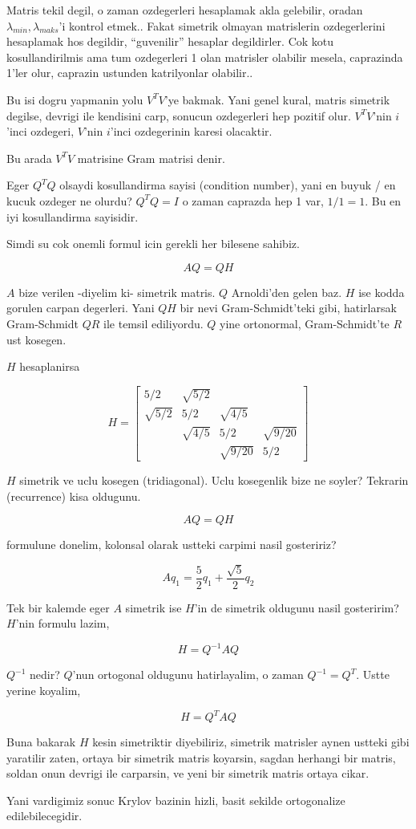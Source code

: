 \documentclass[12pt,fleqn]{article}\usepackage{../common}
\begin{document}
Matris tekil degil, o zaman ozdegerleri hesaplamak akla gelebilir,
oradan $\lambda_{min}, \lambda_{maks}$'i kontrol etmek.. Fakat simetrik
olmayan matrislerin ozdegerlerini hesaplamak hos degildir, ``guvenilir''
hesaplar degildirler. Cok kotu kosullandirilmis ama tum ozdegerleri 1 olan
matrisler olabilir mesela, caprazinda 1'ler olur, caprazin ustunden
katrilyonlar olabilir.. 

Bu isi dogru yapmanin yolu $V^TV$'ye bakmak. Yani genel kural, matris
simetrik degilse, devrigi ile kendisini carp, sonucun ozdegerleri hep
pozitif olur. $V^TV$'nin $i$'inci ozdegeri, $V$'nin $i$'inci ozdegerinin
karesi olacaktir. 

Bu arada $V^TV$ matrisine Gram matrisi denir. 

Eger $Q^TQ$ olsaydi kosullandirma sayisi (condition number), yani en buyuk /
en kucuk ozdeger ne olurdu? $Q^TQ = I$  o zaman caprazda hep 1 var, $1/1 =
1$. 
Bu en iyi kosullandirma sayisidir. 

Simdi su cok onemli formul icin gerekli her bilesene sahibiz. 

\[ AQ = QH \]

$A$ bize verilen -diyelim ki- simetrik matris. $Q$ Arnoldi'den gelen
baz. $H$ ise kodda gorulen carpan degerleri. Yani $QH$ bir nevi
Gram-Schmidt'teki gibi, hatirlarsak Gram-Schmidt $QR$ ile temsil
ediliyordu. $Q$ yine ortonormal, Gram-Schmidt'te $R$ ust kosegen. 

$H$ hesaplanirsa

\[  H = 
\left[\begin{array}{rrrr}
5/2 & \sqrt{ 5/2} && \\
\sqrt{ 5/2} & 5/2 & \sqrt{ 4/5}& \\
 & \sqrt{ 4/5} & 5/2 & \sqrt{ 9/20}\\
 &&  \sqrt{ 9/20} & 5/2 
\end{array}\right]
\]

$H$ simetrik ve uclu kosegen (tridiagonal). Uclu kosegenlik bize ne
soyler?  Tekrarin (recurrence) kisa oldugunu.

\[ AQ = QH \]

formulune donelim, kolonsal olarak ustteki carpimi nasil gosteririz? 

\[ Aq_1  = \frac{ 5}{2}q_1  + \frac{ \sqrt{ 5}}{2} q_2 \]

Tek bir kalemde eger $A$ simetrik ise $H$'in de simetrik oldugunu nasil
gosteririm? $H$'nin formulu lazim, 

\[ H = Q^{-1}AQ \]

$Q^{-1}$ nedir? $Q$'nun ortogonal oldugunu hatirlayalim, o zaman 
$Q^{-1} =
Q^T$. Ustte yerine koyalim,

\[ H = Q^{T}AQ \]

Buna bakarak $H$ kesin simetriktir diyebiliriz, simetrik matrisler aynen
ustteki gibi yaratilir zaten, ortaya bir simetrik matris koyarsin, sagdan
herhangi bir matris, soldan onun devrigi ile carparsin, ve yeni bir
simetrik matris ortaya cikar. 

Yani vardigimiz sonuc Krylov bazinin hizli, basit sekilde ortogonalize
edilebilecegidir. 
\end{document}
